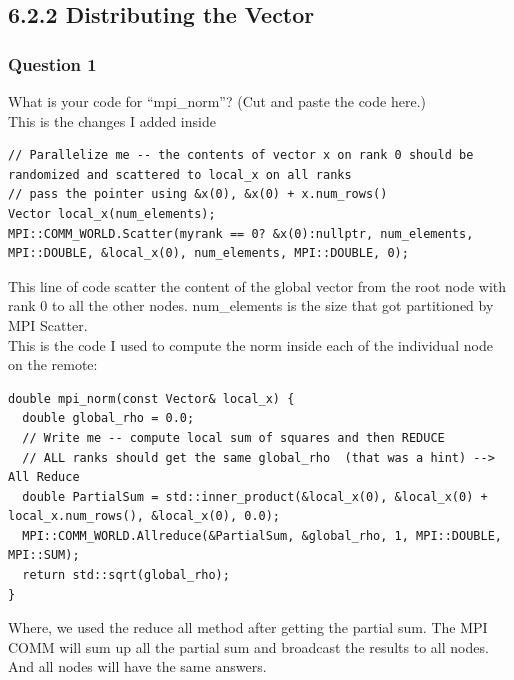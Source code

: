 \documentclass[]{article}
\begin{document}
    \subsection*{6.2.2 Distributing the Vector}
        \subsubsection*{Question 1}
            What is your code for ``mpi\_norm''? (Cut and paste the code here.)
            \\[1.1em]
            This is the changes I added inside 
            \begin{lstlisting}
// Parallelize me -- the contents of vector x on rank 0 should be randomized and scattered to local_x on all ranks
// pass the pointer using &x(0), &x(0) + x.num_rows()
Vector local_x(num_elements);
MPI::COMM_WORLD.Scatter(myrank == 0? &x(0):nullptr, num_elements, MPI::DOUBLE, &local_x(0), num_elements, MPI::DOUBLE, 0);
            \end{lstlisting}
            This line of code scatter the content of the global vector from the root node with rank 0 to all the other nodes. num\_elements is the size that got partitioned by MPI Scatter. 
            \\[1.1em]
            This is the code I used to compute the norm inside each of the individual node on the remote: 
            \begin{lstlisting}
double mpi_norm(const Vector& local_x) {
  double global_rho = 0.0;
  // Write me -- compute local sum of squares and then REDUCE 
  // ALL ranks should get the same global_rho  (that was a hint) --> All Reduce
  double PartialSum = std::inner_product(&local_x(0), &local_x(0) + local_x.num_rows(), &local_x(0), 0.0);
  MPI::COMM_WORLD.Allreduce(&PartialSum, &global_rho, 1, MPI::DOUBLE, MPI::SUM);
  return std::sqrt(global_rho);
}
            \end{lstlisting}
            Where, we used the reduce all method after getting the partial sum. The MPI COMM will sum up all the partial sum and broadcast the results to all nodes. And all nodes will have the same answers. 
\end{document}
